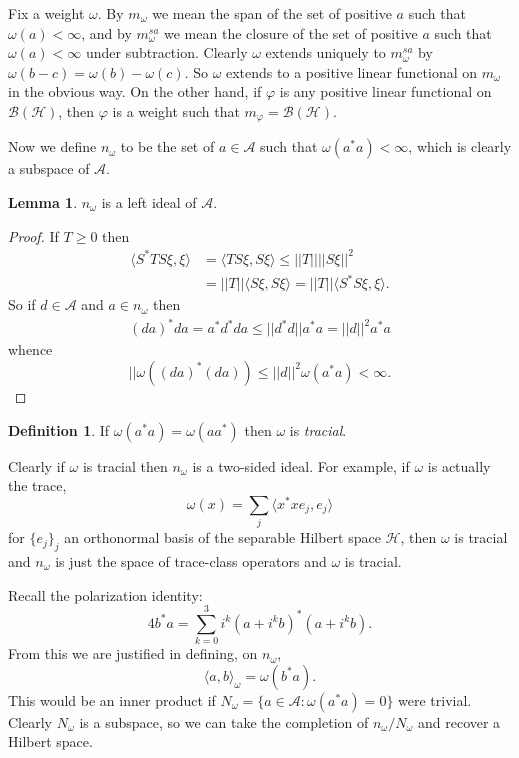 \documentclass[12pt]{report}
\theoremstyle{definition}
\newtheorem{lemma}[theorem]{Lemma}
\newtheorem{definition}[theorem]{Definition}
\begin{document}
Fix a weight $\omega$. By $m_\omega$ we mean the span of the set of positive $a$ such that $\omega(a) < \infty$, and by $m_\omega^{sa}$ we mean the closure of the set of positive $a$ such that $\omega(a) < \infty$ under subtraction. Clearly $\omega$ extends uniquely to $m_\omega^{sa}$ by $\omega(b-c) = \omega(b) - \omega(c)$. So $\omega$ extends to a positive linear functional on $m_\omega$ in the obvious way. On the other hand, if $\varphi$ is any positive linear functional on $\mathcal B(\mathcal H)$, then $\varphi$ is a weight such that $m_\varphi = \mathcal B(\mathcal H)$.

Now we define $n_\omega$ to be the set of $a \in \mathcal A$ such that $\omega(a^*a) < \infty$, which is clearly a subspace of $\mathcal A$.
\begin{lemma}
    $n_\omega$ is a left ideal of $\mathcal A$.
\begin{proof}
    If $T \geq 0$ then
    \begin{align*}
        \langle S^*TS\xi, \xi\rangle
            &= \langle TS\xi, S\xi\rangle
            \leq ||T|| ||S\xi||^2\\
            &= ||T|| \langle S\xi, S\xi\rangle
            = ||T|| \langle S^*S\xi, \xi\rangle.
    \end{align*}
    So if $d \in \mathcal A$ and $a \in n_\omega$ then
    \begin{align*}
        (da)^*da = a^*d^*da \leq ||d^*d|| a^*a = ||d||^2 a^*a
    \end{align*}
    whence
    $$||\omega((da)^*(da)) \leq ||d||^2 \omega(a^*a) < \infty.$$
\end{proof}
\end{lemma}
\begin{definition}
If $\omega(a^*a) = \omega(aa^*)$ then $\omega$ is \emph{tracial}.
\end{definition}
Clearly if $\omega$ is tracial then $n_\omega$ is a two-sided ideal. For example, if $\omega$ is actually the trace,
$$\omega(x) = \sum_j \langle x^*xe_j, e_j\rangle$$
for $\{e_j\}_j$ an orthonormal basis of the separable Hilbert space $\mathcal H$, then $\omega$ is tracial and $n_\omega$ is just the space of trace-class operators and $\omega$ is tracial.

Recall the polarization identity:
$$4b^*a = \sum_{k=0}^3 i^k(a+i^kb)^*(a+i^kb).$$
From this we are justified in defining, on $n_\omega$,
$$\langle a, b\rangle_\omega = \omega(b^*a).$$
This would be an inner product if $N_\omega = \{a \in \mathcal A: \omega(a^*a) = 0\}$ were trivial. Clearly $N_\omega$ is a subspace, so we can take the completion of $n_\omega/N_\omega$ and recover a Hilbert space.
\end{document}
